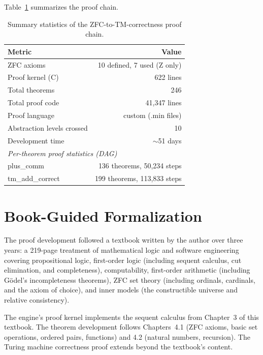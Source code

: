 \documentclass[letterpaper]{article}
\begin{document}
Table~\ref{tab:summary} summarizes the proof chain.

\begin{table}[h]
\centering
\begin{tabular}{p{}r}
\toprule
\textbf{Metric} & \textbf{Value} \\
\midrule
ZFC axioms & 10 defined, 7 used (Z only) \\
Proof kernel (C) & 622 lines \\
Total theorems & 246 \\
Total proof code & 41,347 lines \\
Proof language & custom (.min files) \\
Abstraction levels crossed & 10 \\
Development time & $\sim$51 days \\
\midrule
\multicolumn{2}{l}{\emph{Per-theorem proof statistics (DAG)}} \\
\midrule
plus\_comm & 136 theorems, 50,234 steps \\
tm\_add\_correct & 199 theorems, 113,833 steps \\
\bottomrule
\end{tabular}
\caption{Summary statistics of the ZFC-to-TM-correctness proof chain.}
\label{tab:summary}
\end{table}

\section{Book-Guided Formalization}
\label{sec:book}

The proof development followed a textbook written by the author over
three years: a 219-page treatment of mathematical logic and software
engineering covering propositional logic, first-order logic (including sequent
calculus, cut elimination, and completeness), computability, first-order
arithmetic (including G\"{o}del's incompleteness theorems), ZFC set theory
(including ordinals, cardinals, and the axiom of choice), and inner models
(the constructible universe and relative consistency).

The engine's proof kernel implements the sequent calculus from Chapter~3 of
this textbook. The theorem development follows Chapters~4.1 (ZFC axioms,
basic set operations, ordered pairs, functions) and 4.2 (natural numbers,
recursion). The Turing machine correctness proof extends beyond the textbook's
content.
\end{document}
